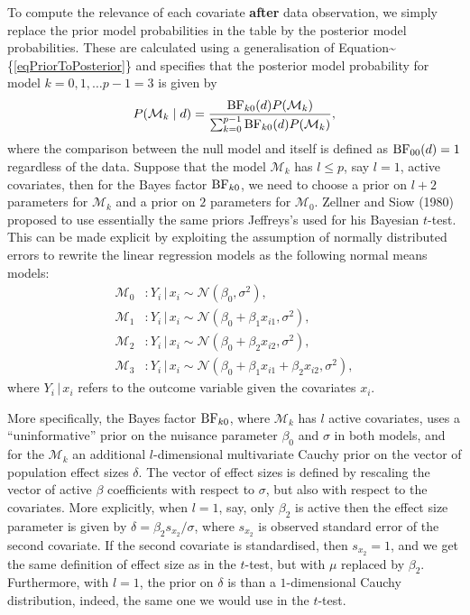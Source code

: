 \documentclass[english,,doc,floatsintext]{apa6}
\begin{document}
To compute the relevance of each covariate \textbf{after} data observation, we simply replace the prior model probabilities in the table by the posterior model probabilities. These are calculated using a generalisation of Equation\textasciitilde{}\{\eqref{eqPriorToPosterior}\} and specifies that the posterior model probability for model \(k=0, 1, \ldots p-1 = 3\) is given by
\begin{align}
\label{eqPriorToPosteriorGeneral}
P(\mathcal{M}_{k} \mid d) = \frac{ \textnormal{BF}_{k0}(d) P(\mathcal{M}_{k})}{ \sum_{k=0}^{p-1} \textnormal{BF}_{k0}(d) P(\mathcal{M}_{k})},
\end{align}
where the comparison between the null model and itself is defined as \(\textnormal{BF}_{00}(d) = 1\) regardless of the data. Suppose that the model \(\mathcal{M}_{k}\) has \(l \leq p\), say \(l =1\), active covariates, then for the Bayes factor \(\textnormal{BF}_{k0}\), we need to choose a prior on \(l + 2\) parameters for \(\mathcal{M}_{k}\) and a prior on \(2\) parameters for \(\mathcal{M}_{0}\). Zellner and Siow (1980) proposed to use essentially the same priors Jeffreys's used for his Bayesian \(t\)-test. This can be made explicit by exploiting the assumption of normally distributed errors to rewrite the linear regression models as the following normal means models:
\begin{align}
\label{eqLinRegAsNormal0}
\mathcal{M}_{0} & : Y_{i} \, | \, x_{i} \sim \mathcal{N}(\beta_{0}, \sigma^{2}), \\
\mathcal{M}_{1} & : Y_{i} \, | \, x_{i} \sim \mathcal{N}(\beta_{0} + \beta_{1} x_{i1}, \sigma^{2}), \\
\mathcal{M}_{2} & : Y_{i} \, | \, x_{i} \sim \mathcal{N}(\beta_{0} + \beta_{2} x_{i2}, \sigma^{2}), \\
\label{eqLinRegAsNormal3}
\mathcal{M}_{3} & : Y_{i} \, | \, x_{i} \sim \mathcal{N}(\beta_{0} + \beta_{1} x_{i1} + \beta_{2} x_{i2} , \sigma^{2}), 
\end{align}
where \(Y_{i} \, | \, x_{i}\) refers to the outcome variable given the covariates \(x_{i}\).

More specifically, the Bayes factor \(\textnormal{BF}_{k0}\), where \(\mathcal{M}_{k}\) has \(l\) active covariates, uses a \enquote{uninformative} prior on the nuisance parameter \(\beta_{0}\) and \(\sigma\) in both models, and for the \(\mathcal{M}_{k}\) an additional \(l\)-dimensional multivariate Cauchy prior on the vector of population effect sizes \(\delta\). The vector of effect sizes is defined by rescaling the vector of active \(\beta\) coefficients with respect to \(\sigma\), but also with respect to the covariates. More explicitly, when \(l=1\), say, only \(\beta_{2}\) is active then the effect size parameter is given by \(\delta = \beta_{2} s_{x_{2}}/\sigma\), where \(s_{x_{2}}\) is observed standard error of the second covariate. If the second covariate is standardised, then \(s_{x_{2}} = 1\), and we get the same definition of effect size as in the \(t\)-test, but with \(\mu\) replaced by \(\beta_{2}\). Furthermore, with \(l = 1\), the prior on \(\delta\) is than a \(1\)-dimensional Cauchy distribution, indeed, the same one we would use in the \(t\)-test.
\end{document}
